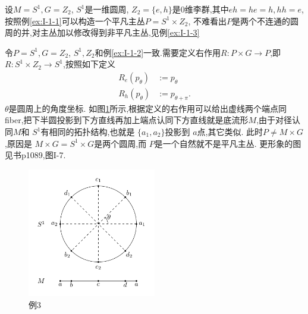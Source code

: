 \documentclass[../main.tex]{subfiles}
\begin{document}
 \begin{example}
 \label{ex:I-1-2}
 设$M = S^1,G = Z_2$, $S^1$是一维圆周, $Z_2 = \{e,h\}$是0维李群,其中$eh =he =h, hh = e$,按照例\ref{ex:I-1-1}可以构造一个平凡主丛$P = S^1 \times Z_2$,
 不难看出$P$是两个不连通的圆周的并,对主丛加以修改得到非平凡主丛,见例\ref{ex:I-1-3}
 \end{example}
 \begin{example}
 \label{ex:I-1-3}
 令$P = S^1,G = Z_2$, $S^1,Z_2$和例\ref{ex:I-1-2}一致.需要定义右作用$R:P\times G \to P$,即$R: S^1 \times Z_2 \to S^1$,按照如下定义
 \begin{align*}
   R_e(p_\theta)&:= p_\theta\\
   R_h(p_\theta)&:= p_{\theta+\pi}
 .\end{align*}
 $\theta$是圆周上的角度坐标.
 如图\ref{fig:I-1-3}所示,根据定义的右作用可以给出虚线两个端点同fiber,把下半圆投影到下方直线再加上端点认同下方直线就是底流形$M$,由于对径认同$M$和 $S^1$有相同的拓扑结构,也就是 $\{a_1,a_2\}$投影到 $a$点,其它类似.
 此时$P \neq M\times G$,原因是 $M \times G = S^1 \times G$是两个圆周,而 $P$是一个自然就不是平凡主丛.
 更形象的图见书p1089,图I-7.
 \begin{figure}[htpb]
   \centering
   \includegraphics[width=0.5\textwidth]{../tikzpicture/exI13.pdf}
   \caption{例3}
   \label{fig:I-1-3}
 \end{figure}
 \end{example}
\end{document}
